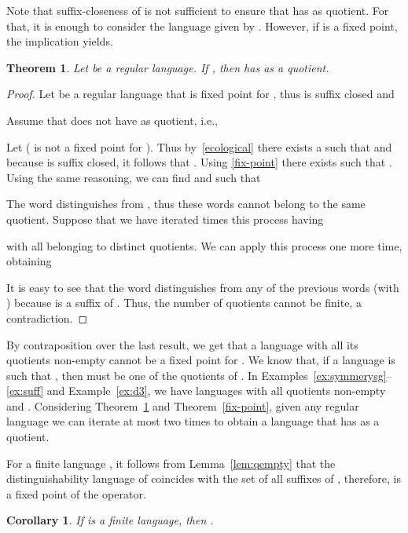 \documentclass{article}
\newtheorem{theorem}{Theorem}
\newtheorem{corollary}{Corollary}
\begin{document}
Note that suffix-closeness of  is not sufficient to ensure that  has  as quotient.
 For that, it is enough to consider the language given by .
 However, if  is a  fixed point, the implication yields.

\begin{theorem}
\label{ldead}
    Let  be a regular language.
If , then  has  as a quotient. 
\end{theorem}
\begin{proof}
Let  be a regular language that is fixed point for , thus  is suffix closed and 

Assume that  does not have  as quotient, i.e., 

Let  ( is not a fixed point for ). 
Thus by~\eqref{ecological} there  exists a  such that 
 and because  is suffix closed, it follows that . 
Using \eqref{fix-point} there exists  such that . 
Using the same reasoning, we can find  and  such that 

The word  distinguishes  from , thus these words cannot belong to the same quotient. Suppose that we have iterated  times this process having 

with all  belonging to 
distinct quotients. We can apply this process one more time, obtaining 
 
It is easy to see that the word  distinguishes  from 
any of the previous words  (with ) because  is a suffix of .
Thus, the number of  quotients cannot be finite, a contradiction.
\end{proof}

By contraposition over the last result, we get that  a language 
with all its quotients non-empty cannot be a fixed point for . 
 We know that, if a language  is such
that , then  must be one of
the quotients of . 
In Examples~\ref{ex:symmerysg}--\ref{ex:suff}
and Example~\ref{ex:d3}, we have  languages  with all quotients non-empty and  . Considering Theorem~\ref{ldead} and Theorem~\ref{fix-point}, given any regular language  we can iterate  at most two times to obtain a language that has  as a quotient.

For a finite language , 
it follows from Lemma~\ref{lem:qempty}
that the
distinguishability language of  coincides with the set of all suffixes of ,
therefore,  is a fixed point of the  operator.

\begin{corollary}
\label{cor:finite}
  If  is a finite language, then .
\end{corollary}
\end{document}
